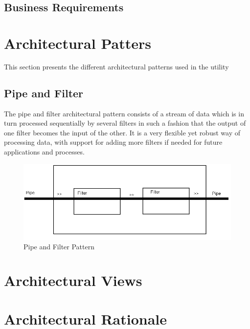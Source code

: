 \subsection{Business Requirements}


\section{Architectural Patters}
This section presents the different architectural patterns used in the utility
\subsection{Pipe and Filter}
The pipe and filter architectural pattern consists of a stream of data which is in turn processed sequentially by several filters in such a fashion that the output of one filter becomes the input of the other. It is a very flexible yet robust way of processing data, with support for adding more filters if needed for future applications and processes.
\begin{figure}
\caption{Pipe and Filter Pattern}
\includegraphics[width = \textwidth]{./planning/img/PipeAndFilter}
\end{figure}


\section{Architectural Views}

\section{Architectural Rationale}


